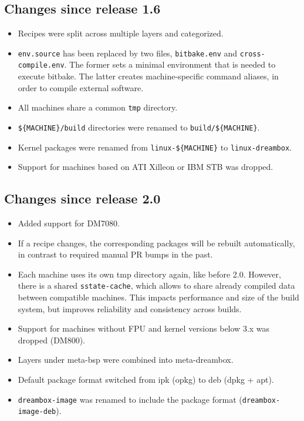 \documentclass[a4paper]{article}
\newcommand{\shell}[1]{\texttt{\small #1}}
\begin{document}
  \subsection{Changes since release 1.6}
    \begin{itemize}
      \item Recipes were split across multiple layers and categorized.
      \item \shell{env.source} has been replaced by two files,
        \shell{bitbake.env} and \shell{cross-compile.env}. The former sets a minimal
        environment that is needed to execute bitbake. The latter creates
        machine-specific command aliases, in order to compile external software.
      \item All machines share a common \shell{tmp} directory.
      \item \shell{\$\{MACHINE\}/build} directories were renamed to \shell{build/\$\{MACHINE\}}.
      \item Kernel packages were renamed from \shell{linux-\$\{MACHINE\}} to \shell{linux-dreambox}.
      \item Support for machines based on ATI Xilleon or IBM STB was dropped.
    \end{itemize}

  \subsection{Changes since release 2.0}
    \begin{itemize}
      \item Added support for DM7080.
      \item If a recipe changes, the corresponding packages will be rebuilt automatically,
            in contrast to required manual PR bumps in the past.
      \item Each machine uses its own tmp directory again, like before 2.0. However,
            there is a shared \shell{sstate-cache}, which allows to share already compiled
            data between compatible machines. This impacts performance and size of the
            build system, but improves reliability and consistency across builds.
      \item Support for machines without FPU and kernel versions below 3.x was dropped (DM800).
      \item Layers under meta-bsp were combined into meta-dreambox.
      \item Default package format switched from ipk (opkg) to deb (dpkg + apt).
      \item \shell{dreambox-image} was renamed to include the package format (\shell{dreambox-image-deb}).
    \end{itemize}
\end{document}
